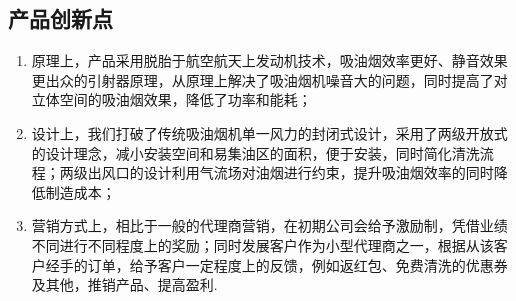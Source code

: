 \subsection{产品创新点}
\begin{enumerate}
\item 原理上，产品采用脱胎于航空航天上发动机技术，吸油烟效率更好、静音效果更出众的引射器原理，从原理上解决了吸油烟机噪音大的问题，同时提高了对立体空间的吸油烟效果，降低了功率和能耗；

\item 设计上，我们打破了传统吸油烟机单一风力的封闭式设计，采用了两级开放式的设计理念，减小安装空间和易集油区的面积，便于安装，同时简化清洗流程；两级出风口的设计利用气流场对油烟进行约束，提升吸油烟效率的同时降低制造成本；

\item 营销方式上，相比于一般的代理商营销，在初期公司会给予激励制，凭借业绩不同进行不同程度上的奖励；同时发展客户作为小型代理商之一，根据从该客户经手的订单，给予客户一定程度上的反馈，例如返红包、免费清洗的优惠券及其他，推销产品、提高盈利.
\end{enumerate}
